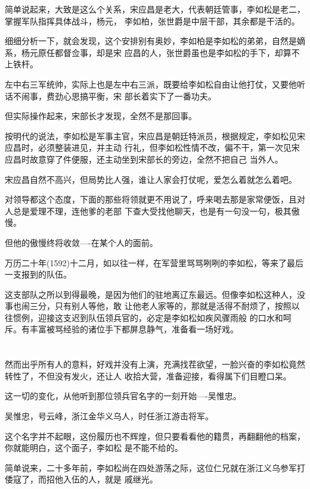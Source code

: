 \documentclass[11pt,a4paper,onecolumn]{article}
\begin{document}
简单说起来，大致是这么个关系，宋应昌是老大，代表朝廷管事，李如松是老二，掌握军队指挥具体战斗，杨元，
李如柏，张世爵是中层干部，其余都是干活的。

细细分析一下，就会发现，这个安排别有奥妙，李如柏是李如松的弟弟，自然是嫡系，杨元原任都督佥事，却是宋
应昌的人，张世爵虽也是李如松的手下，却算不上铁杆。

左中右三军统帅，实际上也是左中右三派，既要给李如松自由让他打仗，又要他听话不闹事，费劲心思搞平衡，宋
部长着实下了一番功夫。

但实际操作起来，宋部长才发现，全然不是那回事。

按明代的说法，李如松是军事主官，宋应昌是朝廷特派员，根据规定，李如松见宋应昌时，必须整装进见，并主动
行礼，但李如松性情不改，偏不干，第一次见宋应昌时故意穿了件便服，还主动坐到宋部长的旁边，全然不把自己
当外人。

宋应昌自然不高兴，但局势比人强，谁让人家会打仗呢，爱怎么着就怎么着吧。

对领导都这个态度，下面的那些将领就更不用说了，呼来喝去那是家常便饭，且对人总是爱理不理，连他爹的老部
下查大受找他聊天，也是有一句没一句，极其傲慢。

但他的傲慢终将收敛----在某个人的面前。

万历二十年(1592)十二月，如以往一样，在军营里骂骂咧咧的李如松，等来了最后一支报到的队伍。

这支部队之所以到得最晚，是因为他们的驻地离辽东最远。但像李如松这种人，没事也闹三分，只有别人等他，敢
让他老人家等的，那就是活得不耐烦了，按照以往惯例，迎接这支迟到队伍领兵官的，必定是李如松如疾风骤雨般
的口水和呵斥。有丰富被骂经验的诸位手下都屏息静气，准备看一场好戏。

\section[\thesection]{}

然而出乎所有人的意料，好戏并没有上演，充满找茬欲望，一脸兴奋的李如松竟然转性了，不但没有发火，还让人
收拾大营，准备迎接，看得属下们目瞪口呆。

这一切的变化，从他听到那位领兵官名字的一刻开始----吴惟忠。

吴惟忠，号云峰，浙江金华义乌人，时任浙江游击将军。

这个名字并不起眼，这份履历也不辉煌，但只要看看他的籍贯，再翻翻他的档案，你就能明白，这个面子，李如松
是不能不给的。

简单说来，二十多年前，李如松尚在四处游荡之际，这位仁兄就在浙江义乌参军打倭寇了，而招他入伍的人，就是
戚继光。
\end{document}
